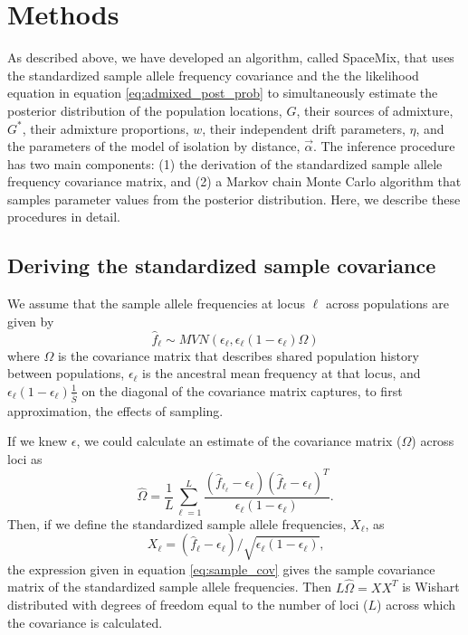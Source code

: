 \documentclass[12pt]{article}
\newcommand{\identifyadmixsource}[1]{{#1^{*}}}
\begin{document}
\newpage

\section*{Methods}
As described above, we have developed an algorithm, called SpaceMix, that uses the standardized sample allele frequency covariance and the the likelihood equation in equation \eqref{eq:admixed_post_prob} to simultaneously estimate the posterior distribution of the population locations, $G$, their sources of admixture, $\identifyadmixsource{G}$, their admixture proportions, $w$, their independent drift parameters, $\eta$, and the parameters of the model of isolation by distance, $\vec{\alpha}$.  The inference procedure has two main components: (1) the derivation of the standardized sample allele frequency covariance matrix, and (2) a Markov chain Monte Carlo algorithm that samples parameter values from the posterior distribution.  Here, we describe these procedures in detail.

\subsection*{Deriving the standardized sample covariance}

We assume that the sample allele frequencies at locus $\ell$ across populations are given by
%
\begin{equation}
\hat{f}_{\ell} \sim MVN(\epsilon_{\ell}, \epsilon_{\ell} (1-\epsilon_{\ell})\Omega)
\end{equation}
%
where $\Omega$ is the covariance matrix that describes shared population history between populations, $\epsilon_{\ell}$ is the ancestral mean frequency at that locus, and $\epsilon_{\ell}(1 - \epsilon_{\ell})  \frac{1}{\bar{S}}$ on the diagonal of the covariance matrix captures, to first approximation, the effects of sampling.

If we knew $\epsilon$, we could calculate an estimate of the covariance matrix ($\Omega$) across loci as 
%
\begin{equation}
\widehat{\Omega} = \frac{1}{L} \sum_{\ell=1}^{L} \frac{(\hat{f}_{\ell_{\ell}}  - \epsilon_{\ell}) (\hat{f}_{\ell}  - \epsilon_{\ell})^T}{\epsilon_{\ell}(1-\epsilon_{\ell})} \text{.}
\end{equation}
%
Then, if we define the standardized sample allele frequencies, $X_\ell$, as
%
\begin{equation}
X_\ell = (\hat{f}_{\ell}  - \epsilon_{\ell})/\sqrt{\epsilon_{\ell}(1-\epsilon_{\ell})}\text{,}
\end{equation}
%
the expression given in equation \eqref{eq:sample_cov} gives the sample covariance matrix of the standardized sample allele frequencies. Then $L\widehat{\Omega} = X X^T$  is Wishart distributed with degrees of freedom equal to the number of loci ($L$) across which the covariance is calculated. 
\end{document}
